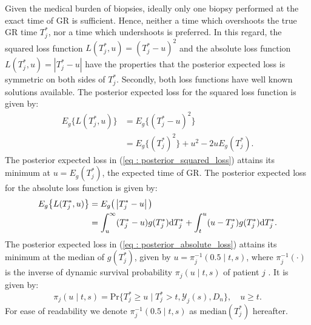 Given the medical burden of biopsies, ideally only one biopsy performed at the exact time of GR is sufficient. Hence, neither a time which overshoots the true GR time $T^*_j$, nor a time which undershoots is preferred. In this regard, the squared loss function $L(T^*_j, u) = (T^*_j - u)^2$ and the absolute loss function $L(T^*_j, u) = \left|{T^*_j - u}\right|$ have the properties that the posterior expected loss is symmetric on both sides of $T^*_j$. Secondly, both loss functions have well known solutions available. The posterior expected loss for the squared loss function is given by:
\begin{equation}
\label{eq : posterior_squared_loss}
\begin{split}
E_g\big\{L(T^*_j, u)\big\} &= E_g\big\{(T^*_j - u)^2\big\}\\
&=E_g\big\{(T^*_j)^2\big\} + u^2 -2uE_g(T^*_j).
\end{split}
\end{equation}
The posterior expected loss in (\ref{eq : posterior_squared_loss}) attains its minimum at $u = E_g(T^*_j)$, the expected time of GR. The posterior expected loss for the absolute loss function is given by:
\begin{equation}
\label{eq : posterior_absolute_loss}
\begin{split}
E_g\big\{L(T^*_j, u)\big\} &= E_g\big(\left|{T^*_j - u}\right|\big)\\
&= \int_u^\infty (T^*_j - u) g(T^*_j)\rmn{d} T^*_j + \int_t^u (u - T^*_j) g(T^*_j)\rmn{d} T^*_j.
\end{split}
\end{equation}
The posterior expected loss in (\ref{eq : posterior_absolute_loss}) attains its minimum at the median of $g(T^*_j)$, given by $u = \pi_j^{-1}(0.5 \mid t,s)$, where $\pi_j^{-1}(\cdot)$ is the inverse of dynamic survival probability $\pi_j(u \mid t, s)$ of patient $j$ \citep{rizopoulos2011dynamic}. It is given by:
\begin{equation}
\label{eq : dynamic_surv_prob}
\pi_j(u \mid t, s) = \mbox{Pr}\big\{T^*_j \geq u \mid  T^*_j >t, \mathcal{Y}_j(s), D_n\big\}, \quad u \geq t.
\end{equation}
For ease of readability we denote $\pi_j^{-1}(0.5 \mid t,s)$ as $\mbox{median}(T^*_j)$ hereafter.

